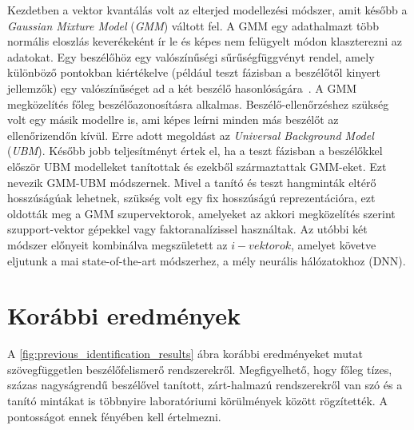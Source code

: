 Kezdetben a vektor kvantálás volt az elterjed modellezési módszer, amit később a \emph{Gaussian Mixture Model} (\emph{GMM}) váltott fel. A GMM egy adathalmazt több normális eloszlás keverékeként ír le és képes nem felügyelt módon klaszterezni az adatokat. Egy beszélőhöz egy valószínűségi sűrűségfüggvényt rendel, amely különböző pontokban kiértékelve (például teszt fázisban a beszélőtől kinyert jellemzők) egy valószínűséget ad a két beszélő hasonlóságára~\cite{taufiq_2015}.
\newline
\newline
A GMM megközelítés főleg beszélőazonosításra alkalmas. Beszélő-ellenőrzéshez szükség volt egy másik modellre is, ami képes leírni minden más beszélőt az ellenőrizendőn kívül. Erre adott megoldást az \emph{Universal Background Model} (\emph{UBM}). Később jobb teljesítményt értek el, ha a teszt fázisban a beszélőkkel először UBM modelleket tanítottak és ezekből származtattak GMM-eket. Ezt nevezik GMM-UBM módszernek.
\newline
\newline
Mivel a tanító és teszt hangminták eltérő hosszúságúak lehetnek, szükség volt egy fix hosszúságú reprezentációra, ezt oldották meg a GMM szupervektorok, amelyeket az akkori megközelítés szerint szupport-vektor gépekkel vagy faktoranalízissel használtak.
\newline
\newline
Az utóbbi két módszer előnyeit kombinálva megszületett az $i-vektorok$, amelyet követve eljutunk a mai state-of-the-art módszerhez, a mély neurális hálózatokhoz (DNN).

\section{Korábbi eredmények}

A \ref{fig:previous_identification_results} ábra korábbi eredményeket mutat szövegfüggetlen beszélőfelismerő rendszerekről. Megfigyelhető, hogy főleg tízes, százas nagyságrendű beszélővel tanított, zárt-halmazú rendszerekről van szó és a tanító mintákat is többnyire laboratóriumi körülmények között rögzítették. A pontosságot ennek fényében kell értelmezni.

